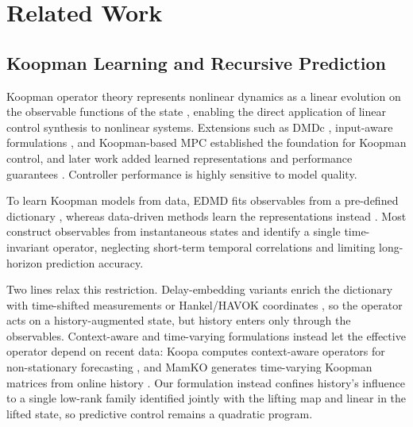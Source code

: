 \section{Related Work}
\label{sec:related_work}

\subsection{Koopman Learning and Recursive Prediction}

Koopman operator theory represents nonlinear dynamics as a linear evolution on the observable functions of the state \cite{koopman1931hamiltonian, koopman1932spectra, mezic2005spectral}, enabling the direct application of linear control synthesis to nonlinear systems. Extensions such as DMDc \cite{proctor2016dmdc}, input-aware formulations \cite{proctor2018generalizing, brunton2016invariant}, and Koopman-based MPC \cite{korda2018linear} established the foundation for Koopman control, and later work added learned representations and performance guarantees \cite{han2020deep, shi2022deep, strasser2026overview, duran2025control}. Controller performance is highly sensitive to model quality.

To learn Koopman models from data, EDMD fits observables from a pre-defined dictionary \cite{williams2015data, williams2015kernel, klus2018data}, whereas data-driven methods learn the representations instead \cite{takeishi2017koopman, lusch2018deep, yeung2019learning, morton2019deep, yuan2022variational}. Most construct observables from instantaneous states and identify a single time-invariant operator, neglecting short-term temporal correlations and limiting long-horizon prediction accuracy.

Two lines relax this restriction. Delay-embedding variants enrich the dictionary with time-shifted measurements or Hankel/HAVOK coordinates \cite{kamb2020timedelay, brunton2017chaos, arbabi2017ergodic, das2019delay}, so the operator acts on a history-augmented state, but history enters only through the observables. Context-aware and time-varying formulations instead let the effective operator depend on recent data: Koopa computes context-aware operators for non-stationary forecasting \cite{liu2023koopa}, and MamKO generates time-varying Koopman matrices from online history \cite{li2025mamko}. Our formulation instead confines history's influence to a single low-rank family identified jointly with the lifting map and linear in the lifted state, so predictive control remains a quadratic program.

